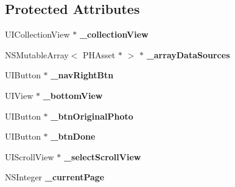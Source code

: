 \subsection*{Protected Attributes}
\begin{DoxyCompactItemize}
\item 
\mbox{\label{category_z_l_show_big_img_view_controller_07_08_a540a2102e39322581b8a14e9b7c7ca1b}} 
U\+I\+Collection\+View $\ast$ {\bfseries \+\_\+collection\+View}
\item 
\mbox{\label{category_z_l_show_big_img_view_controller_07_08_af46ae745098ff28eb3fa53ab96af1c45}} 
N\+S\+Mutable\+Array$<$ P\+H\+Asset $\ast$ $>$ $\ast$ {\bfseries \+\_\+array\+Data\+Sources}
\item 
\mbox{\label{category_z_l_show_big_img_view_controller_07_08_a8c81e9a40129e775e1b15557c1112b65}} 
U\+I\+Button $\ast$ {\bfseries \+\_\+nav\+Right\+Btn}
\item 
\mbox{\label{category_z_l_show_big_img_view_controller_07_08_adb1683002f7bfa41a4faffe1d5421633}} 
U\+I\+View $\ast$ {\bfseries \+\_\+bottom\+View}
\item 
\mbox{\label{category_z_l_show_big_img_view_controller_07_08_abe4866a344acf017defdc2097eb232e7}} 
U\+I\+Button $\ast$ {\bfseries \+\_\+btn\+Original\+Photo}
\item 
\mbox{\label{category_z_l_show_big_img_view_controller_07_08_a28b427715c805dd9b91a0a52db17b45b}} 
U\+I\+Button $\ast$ {\bfseries \+\_\+btn\+Done}
\item 
\mbox{\label{category_z_l_show_big_img_view_controller_07_08_aea9491106d854954614cd572b8936b8a}} 
U\+I\+Scroll\+View $\ast$ {\bfseries \+\_\+select\+Scroll\+View}
\item 
\mbox{\label{category_z_l_show_big_img_view_controller_07_08_a9822df68ff814b2cb1bbdfd72172bf19}} 
N\+S\+Integer {\bfseries \+\_\+current\+Page}
\end{DoxyCompactItemize}
